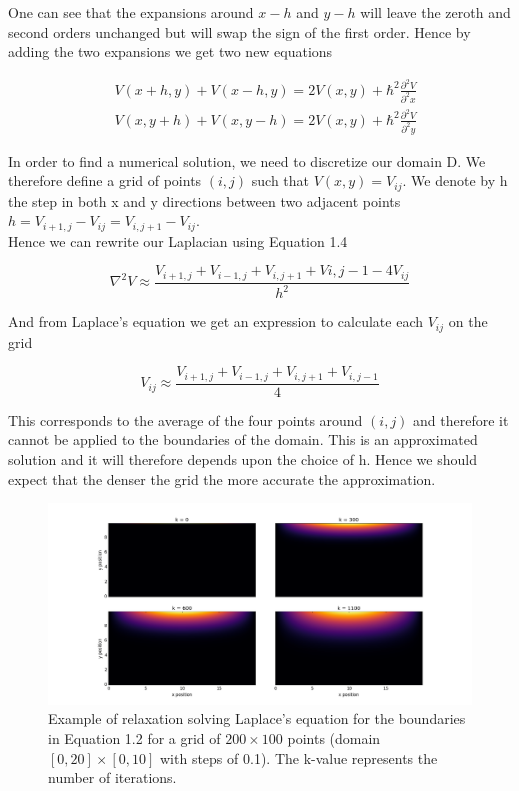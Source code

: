 \documentclass[10 pt]{article}
\numberwithin{equation}{section}
\begin{document}
\begin{multicols}{2}
One can see that the expansions around $x-h$ and $y-h$ will leave the zeroth and second orders unchanged but will swap the sign of the first order. Hence by adding the two expansions we get two new equations

\begin{equation}
\begin{split}
&V(x+h,y) + V(x-h,y) = 2 V(x,y) + \hbar^2 \frac{\partial^2 V}{\partial^2 x}\\
&V(x,y+h) + V(x,y-h) = 2V(x,y) + \hbar^2 \frac{\partial^2 V}{\partial^2 y}
\end{split}
\end{equation}

In order to find a numerical solution, we need to discretize our domain D. We therefore define a grid of points $(i,j)$ such that $V(x,y) = V_{ij}$. We denote by h the step in both x and y directions between two adjacent points $h = V_{i+1, j} - V_{ij} = V_{i, j+1} - V_{ij}$. \\
Hence we can rewrite our Laplacian using Equation 1.4

\begin{equation}
\nabla^2 V \approx \frac{V_{i+1,j} + V_{i-1,j} + V_{i,j+1} + V{i,j-1} - 4V_{ij}}{h^2}
\end{equation}

And from Laplace's equation we get an expression to calculate each $V_{ij}$ on the grid

\begin{equation}
V_{ij} \approx \frac{V_{i+1,j} + V_{i-1,j} + V_{i,j+1} + V_{i,j-1}}{4}
\end{equation}

This corresponds to the average of the four points around $(i,j)$ and therefore it cannot be applied to the boundaries of the domain. This is an approximated solution and it will therefore depends upon the choice of h. Hence we should expect that the denser the grid the more accurate the approximation.

\end{multicols}

\begin{figure}[H]
\includegraphics[width=\linewidth]{Relaxation}
\caption{Example of relaxation solving Laplace's equation for the boundaries in Equation 1.2 for a grid of $200 \times 100$ points (domain $[0,20]\times [0,10]$ with steps of 0.1). The k-value represents the number of iterations.}
\end{figure}
\end{document}
